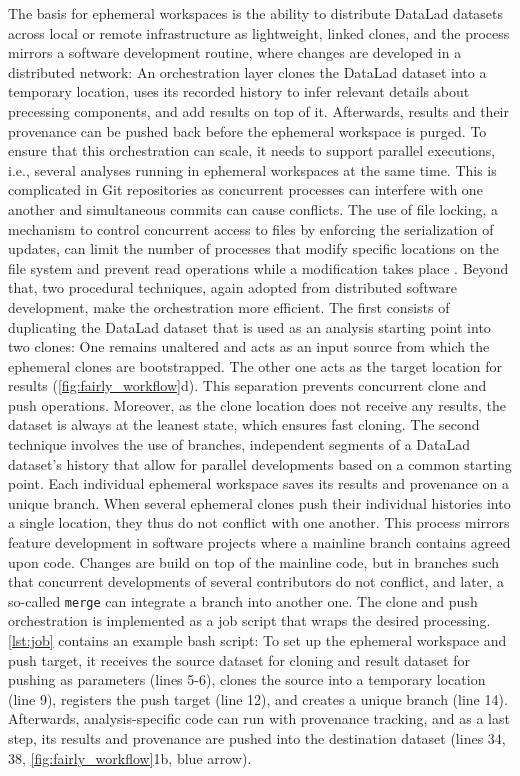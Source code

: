 The basis for ephemeral workspaces is the ability to distribute DataLad datasets across local or remote infrastructure as lightweight, linked clones, and the process mirrors a software development routine, where changes are developed in a distributed network:
An orchestration layer clones the DataLad dataset into a temporary location, uses its recorded history to infer relevant details about precessing components, and add results on top of it.
Afterwards, results and their provenance can be pushed back before the ephemeral workspace is purged.
To ensure that this orchestration can scale, it needs to support parallel executions, i.e., several analyses running in ephemeral workspaces at the same time.
This is complicated in Git repositories as concurrent processes can interfere with one another and simultaneous commits can cause conflicts.
The use of file locking, a mechanism to control concurrent access to files by enforcing the serialization of updates, can limit the number of processes that modify specific locations on the file system and prevent read operations while a modification takes place \citep{xoxa2015implementations}.
Beyond that, two procedural techniques, again adopted from distributed software development, make the orchestration more efficient.
The first consists of duplicating the DataLad dataset that is used as an analysis starting point into two clones: One remains unaltered and acts as an input source from which the ephemeral clones are bootstrapped.
The other one acts as the target location for results (\cref{fig:fairly_workflow}d).
This separation prevents concurrent clone and push operations.
Moreover, as the clone location does not receive any results, the dataset is always at the leanest state, which ensures fast cloning.
The second technique involves the use of branches, independent segments of a DataLad dataset's history that allow for parallel developments based on a common starting point.
Each individual ephemeral workspace saves its results and provenance on a unique branch.
When several ephemeral clones push their individual histories into a single location, they thus do not conflict with one another.
This process mirrors feature development in software projects where a mainline branch contains agreed upon code.
Changes are build on top of the mainline code, but in branches such that concurrent developments of several contributors do not conflict, and later, a so-called \texttt{merge} can integrate a branch into another one.
The clone and push orchestration is implemented as a job script that wraps the desired processing.
\cref{lst:job} contains an example bash script:
To set up the ephemeral workspace and push target, it receives the source dataset for cloning and result dataset for pushing as parameters (lines 5-6), clones the source into a temporary location (line 9), registers the push target (line 12), and creates a unique branch (line 14).
Afterwards, analysis-specific code can run with provenance tracking, and as a last step, its results and provenance are pushed into the destination dataset (lines 34, 38, \cref{fig:fairly_workflow}1b, blue arrow).

